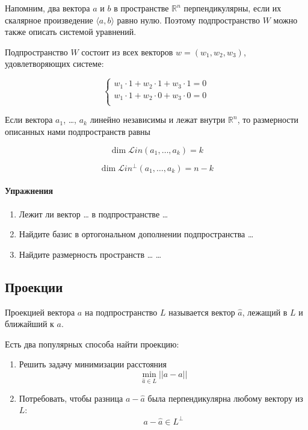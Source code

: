 \documentclass[11pt,russian,]{article}
\let\oldparagraph\paragraph
\renewcommand{\paragraph}[1]{\oldparagraph{#1}\mbox{}}
\newcommand{\RR}{\mathbb{R}}
\renewcommand{\Rn}{\RR^n}
\newcommand{\1}{\mathbbm{1}}
\newcommand{\Lin}{\mathcal{L}in}
\newcommand{\Linp}{\Lin^{\perp}}
\begin{document}
Напомним, два вектора \(a\) и \(b\) в пространстве \(\Rn\)
перпендикулярны, если их скалярное произведение \(\langle a, b \rangle\)
равно нулю. Поэтому подпространство \(W\) можно также описать системой
уравнений.

Подпространство \(W\) состоит из всех векторов \(w=(w_1, w_2, w_3)\),
удовлетворяющих системе:

\[
\begin{cases}
w_1 \cdot 1 + w_2 \cdot 1 + w_3 \cdot 1 = 0 \\
w_1 \cdot 1 + w_2 \cdot 0 + w_3 \cdot 0 = 0 \\
\end{cases}
\]

Если вектора \(a_1\), \ldots, \(a_k\) линейно независимы и лежат внутри
\(\Rn\), то размерности описанных нами подпространств равны

\[
\dim \Lin(a_1, \ldots, a_k) = k
\]

\[
\dim \Linp(a_1, \ldots, a_k) =  n - k
\]

\paragraph{Упражнения}

\begin{enumerate}
\def\labelenumi{\arabic{enumi}.}
\item
  Лежит ли вектор \ldots{} в подпространстве \ldots{}
\item
  Найдите базис в ортогональном дополнении подпространства \ldots{}
\item
  Найдите размерность пространств \ldots{} \ldots{}
\end{enumerate}

\subsection{Проекции}

Проекцией вектора \(a\) на подпространство \(L\) называется вектор
\(\hat a\), лежащий в \(L\) и ближайший к \(a\).

Есть два популярных способа найти проекцию:

\begin{enumerate}
\def\labelenumi{\arabic{enumi}.}
\item
  Решить задачу минимизации расстояния \[
  \min_{\hat a\in L} ||a - \hat a||
  \]
\item
  Потребовать, чтобы разница \(a-\hat a\) была перпендикулярна любому
  вектору из \(L\): \[
  a- \hat a \in L^{\perp}
  \]
\end{enumerate}
\end{document}
